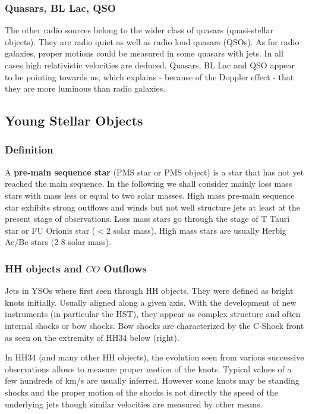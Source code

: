\documentclass[10pt,a4paper,english]{article}
\begin{document}
\subsubsection{Quasars, BL Lac, QSO}

The other radio sources belong to the wider class of quasars (quasi-stellar
objects). They are radio quiet as well as radio loud quasars (QSOs). As for
radio galaxies, proper motions could be measured in some quasars with jets. In
all cases high relativistic velocities are deduced. Quasars, BL Lac and QSO
appear to be pointing towards us, which explains - because of the Doppler
effect - that they are more luminous than radio galaxies.

\subsection{Young Stellar Objects}

\subsubsection{Definition}

A \textbf{pre-main sequence star} (PMS star or PMS object) is a star that has
not yet reached the main sequence. In the following we shall consider mainly
loss mass stars with mass less or equal to two solar masses. High mass pre-main
sequence star exhibits strong outflows and winds but not well structure jets at
least at the present stage of observations. Loss mass stars go through the
stage of T Tauri star or FU Orionis star ($<2$ solar mass). High mass stars are
usually Herbig Ae/Be stars (2-8 solar mass).

\subsubsection{\texorpdfstring{HH objects and $CO$ Outflows}{HH objects and CO Outflows}}

Jets in YSOs where first seen through HH objects. They were defined as bright
knots initially. Usually aligned along a given axis. With the development of
new instruments (in particular the HST), they appear as complex structure and
often internal shocks or bow shocks. Bow shocks are characterized by the
C-Shock front as seen on the extremity of HH34 below (right).

In HH34 (and many other HH objects), the evolution seen from various successive
observations allows to measure proper motion of the knots. Typical values of a
few hundreds of km/s are usually inferred. However some knots may be standing
shocks and the proper motion of the shocks is not directly the speed of the
underlying jets though similar velocities are measured by other means.
\end{document}
